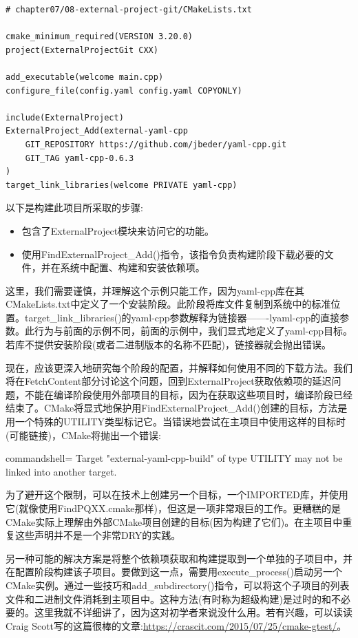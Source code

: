 \begin{lstlisting}[style=styleCMake]
# chapter07/08-external-project-git/CMakeLists.txt

cmake_minimum_required(VERSION 3.20.0)
project(ExternalProjectGit CXX)

add_executable(welcome main.cpp)
configure_file(config.yaml config.yaml COPYONLY)

include(ExternalProject)
ExternalProject_Add(external-yaml-cpp
	GIT_REPOSITORY https://github.com/jbeder/yaml-cpp.git
	GIT_TAG yaml-cpp-0.6.3
)
target_link_libraries(welcome PRIVATE yaml-cpp)
\end{lstlisting} 

以下是构建此项目所采取的步骤:

\begin{itemize}
\item 
包含了ExternalProject模块来访问它的功能。

\item 
使用FindExternalProject\_Add()指令，该指令负责构建阶段下载必要的文件，并在系统中配置、构建和安装依赖项。
\end{itemize}

这里，我们需要谨慎，并理解这个示例只能工作，因为yaml-cpp库在其CMakeLists.txt中定义了一个安装阶段。此阶段将库文件复制到系统中的标准位置。target\_link\_libraries()的yaml-cpp参数解释为链接器——-lyaml-cpp的直接参数。此行为与前面的示例不同，前面的示例中，我们显式地定义了yaml-cpp目标。若库不提供安装阶段(或者二进制版本的名称不匹配)，链接器就会抛出错误。

现在，应该更深入地研究每个阶段的配置，并解释如何使用不同的下载方法。我们将在FetchContent部分讨论这个问题，回到ExternalProject获取依赖项的延迟问题，不能在编译阶段使用外部项目的目标，因为在获取这些项目时，编译阶段已经结束了。CMake将显式地保护用FindExternalProject\_Add()创建的目标，方法是用一个特殊的UTILITY类型标记它。当错误地尝试在主项目中使用这样的目标时(可能链接)，CMake将抛出一个错误:

\begin{tcblisting}{commandshell={}}
Target "external-yaml-cpp-build" of type UTILITY may not be
linked into another target.
\end{tcblisting}

为了避开这个限制，可以在技术上创建另一个目标，一个IMPORTED库，并使用它(就像使用FindPQXX.cmake那样)，但这是一项非常艰巨的工作。更糟糕的是CMake实际上理解由外部CMake项目创建的目标(因为构建了它们)。在主项目中重复这些声明并不是一个非常DRY的实践。

另一种可能的解决方案是将整个依赖项获取和构建提取到一个单独的子项目中，并在配置阶段构建该子项目。要做到这一点，需要用execute\_process()启动另一个CMake实例。通过一些技巧和add\_subdirectory()指令，可以将这个子项目的列表文件和二进制文件消耗到主项目中。这种方法(有时称为超级构建)是过时的和不必要的。这里我就不详细讲了，因为这对初学者来说没什么用。若有兴趣，可以读读Craig Scott写的这篇很棒的文章:\url{https://crascit.com/2015/07/25/cmake-gtest/}。

